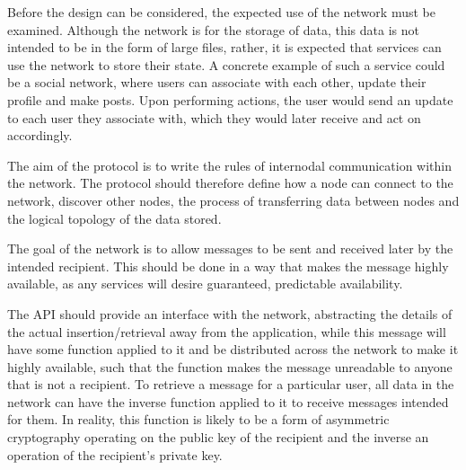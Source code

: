 Before the design can be considered, the expected use of the network must be examined. Although the network is for the storage of data, this data is not intended to be in the form of large files, rather, it is expected that services can use the network to store their state. A concrete example of such a service could be a social network, where users can associate with each other, update their profile and make posts. Upon performing actions, the user would send an update to each user they associate with, which they would later receive and act on accordingly.

The aim of the protocol is to write the rules of internodal communication within the network. The protocol should therefore define how a node can connect to the network, discover other nodes, the process of transferring data between nodes and the logical topology of the data stored.

The goal of the network is to allow messages to be sent and received later by the intended recipient. This should be done in a way that makes the message highly available, as any services will desire guaranteed, predictable availability.

The API should provide an interface with the network, abstracting the details of the actual insertion/retrieval away from the application, while this message will have some function applied to it and be distributed across the network to make it highly available, such that the function makes the message unreadable to anyone that is not a recipient. To retrieve a message for a particular user, all data in the network can have the inverse function applied to it to receive messages intended for them. %
In reality, this function is likely to be a form of asymmetric cryptography operating on the public key of the recipient and the inverse an operation of the recipient's private key.